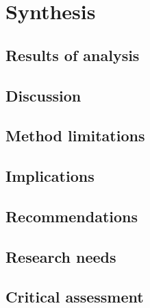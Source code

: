 \newpage
\section{Synthesis}\label{synth}

\subsection{Results of analysis}	 

\subsection{Discussion}

\subsection{Method limitations}\label{methlim}

\subsection{Implications}\label{impli}

\subsection{Recommendations}

\subsection{Research needs}\label{resneed}

\subsection{Critical assessment}
